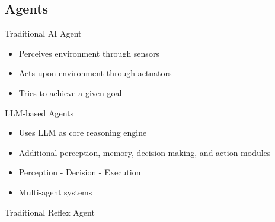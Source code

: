\subsection{Agents}
\begin{frame}{\insertsubsection{} }
	\begin{fancycolumns}[animation=none]
		\begin{definition}{Traditional AI Agent}
			\begin{itemize}
				\item Perceives environment through sensors
				\item Acts upon environment through actuators
				\item Tries to achieve a given goal
			\end{itemize}
		\end{definition} \pause
		\begin{definition}{LLM-based Agents}
			\begin{itemize}
				\item Uses LLM as core reasoning engine
				\item Additional perception, memory, decision-making, and action modules
				\item Perception - Decision - Execution
				\item Multi-agent systems
			\end{itemize}
		\end{definition} \pause
		\nextcolumn
		\begin{example}{Traditional Reflex Agent}
			\centering{}
		\end{example}
	\end{fancycolumns}
\end{frame}
